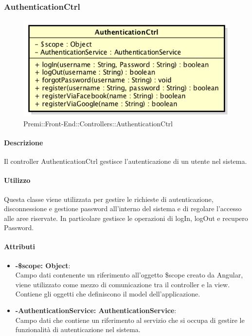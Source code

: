 \subsubsection{AuthenticationCtrl}
\begin{figure}[h]
	\centering
	\includegraphics[width=0.5\linewidth]{img/premi_front_end_controllers_authenticationctrl}
	\caption[Premi::Front-End::Controllers::AuthenticationCtrl]{Premi::Front-End::Controllers::AuthenticationCtrl}
\end{figure}
\paragraph{Descrizione}
	Il controller AuthenticationCtrl gestisce l'autenticazione di un utente nel sistema.
	
	\paragraph{Utilizzo}
	Questa classe viene utilizzata per gestire le richieste di autenticazione, disconnessione e gestione password all'interno del sistema e di regolare l'accesso alle aree riservate.
	In particolare gestisce le operazioni di logIn, logOut e recupero Password.
	\paragraph{Attributi}
	\begin{itemize}
		\item \textbf{-\$scope: Object}:\\
			Campo dati contenente un riferimento all'oggetto \$scope creato da Angular, viene utilizzato come mezzo di comunicazione tra il controller e la view. Contiene gli oggetti che definiscono il model dell'applicazione.
		\item \textbf{-AuthenticationService: AuthenticationService}:\\
			Campo dati che contiene un riferimento al servizio che si occupa di gestire le funzionalità di autenticazione nel sistema.
	\end{itemize}
	
